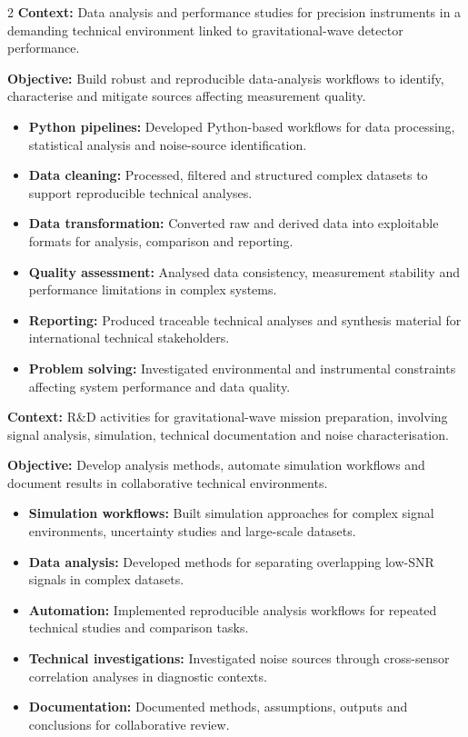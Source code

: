 \documentclass[8pt,a4paper,ragged2e,withhyper]{altacv}
\begin{document}
\begin{paracol}{2}
\textbf{Context:} Data analysis and performance studies for precision instruments in a demanding technical environment linked to gravitational-wave detector performance.

\textbf{Objective:} Build robust and reproducible data-analysis workflows to identify, characterise and mitigate sources affecting measurement quality.

\begin{itemize}
  \item \textbf{Python pipelines:} Developed Python-based workflows for data processing, statistical analysis and noise-source identification.
  \item \textbf{Data cleaning:} Processed, filtered and structured complex datasets to support reproducible technical analyses.
  \item \textbf{Data transformation:} Converted raw and derived data into exploitable formats for analysis, comparison and reporting.
  \item \textbf{Quality assessment:} Analysed data consistency, measurement stability and performance limitations in complex systems.
  \item \textbf{Reporting:} Produced traceable technical analyses and synthesis material for international technical stakeholders.
  \item \textbf{Problem solving:} Investigated environmental and instrumental constraints affecting system performance and data quality.
\end{itemize}

\divider


\textbf{Context:} R\&D activities for gravitational-wave mission preparation, involving signal analysis, simulation, technical documentation and noise characterisation.

\textbf{Objective:} Develop analysis methods, automate simulation workflows and document results in collaborative technical environments.

\begin{itemize}
  \item \textbf{Simulation workflows:} Built simulation approaches for complex signal environments, uncertainty studies and large-scale datasets.
  \item \textbf{Data analysis:} Developed methods for separating overlapping low-SNR signals in complex datasets.
  \item \textbf{Automation:} Implemented reproducible analysis workflows for repeated technical studies and comparison tasks.
  \item \textbf{Technical investigations:} Investigated noise sources through cross-sensor correlation analyses in diagnostic contexts.
  \item \textbf{Documentation:} Documented methods, assumptions, outputs and conclusions for collaborative review.
\end{itemize}


\end{paracol}
\end{document}
